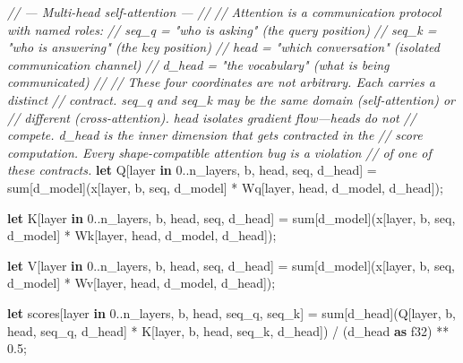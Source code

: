 \documentclass[11pt,]{article}
\newenvironment{Shaded}{}{}
\newcommand{\CommentTok}[1]{\textcolor[rgb]{0.38,0.63,0.69}{\textit{#1}}}
\newcommand{\DataTypeTok}[1]{\textcolor[rgb]{0.56,0.13,0.00}{#1}}
\newcommand{\DecValTok}[1]{\textcolor[rgb]{0.25,0.63,0.44}{#1}}
\newcommand{\KeywordTok}[1]{\textcolor[rgb]{0.00,0.44,0.13}{\textbf{#1}}}
\newcommand{\NormalTok}[1]{#1}
\newcommand{\OperatorTok}[1]{\textcolor[rgb]{0.40,0.40,0.40}{#1}}
\begin{document}
\begin{Shaded}
\begin{Highlighting}[]
\CommentTok{// --- Multi-head self-attention ---}
\CommentTok{//}
\CommentTok{// Attention is a communication protocol with named roles:}
\CommentTok{//   seq_q = "who is asking" (the query position)}
\CommentTok{//   seq_k = "who is answering" (the key position)}
\CommentTok{//   head  = "which conversation" (isolated communication channel)}
\CommentTok{//   d_head = "the vocabulary" (what is being communicated)}
\CommentTok{//}
\CommentTok{// These four coordinates are not arbitrary. Each carries a distinct}
\CommentTok{// contract. seq_q and seq_k may be the same domain (self-attention) or}
\CommentTok{// different (cross-attention). head isolates gradient flow—heads do not}
\CommentTok{// compete. d_head is the inner dimension that gets contracted in the}
\CommentTok{// score computation. Every shape-compatible attention bug is a violation}
\CommentTok{// of one of these contracts.}
\KeywordTok{let}\NormalTok{ Q}\OperatorTok{[}\NormalTok{layer }\KeywordTok{in} \DecValTok{0.}\NormalTok{.n_layers, b, head, seq, d_head}\OperatorTok{]}\NormalTok{ =}
\NormalTok{    sum}\OperatorTok{[}\NormalTok{d_model}\OperatorTok{]}\NormalTok{(x}\OperatorTok{[}\NormalTok{layer, b, seq, d_model}\OperatorTok{]}\NormalTok{ *}
\NormalTok{                  Wq}\OperatorTok{[}\NormalTok{layer, head, d_model, d_head}\OperatorTok{]}\NormalTok{);}

\KeywordTok{let}\NormalTok{ K}\OperatorTok{[}\NormalTok{layer }\KeywordTok{in} \DecValTok{0.}\NormalTok{.n_layers, b, head, seq, d_head}\OperatorTok{]}\NormalTok{ =}
\NormalTok{    sum}\OperatorTok{[}\NormalTok{d_model}\OperatorTok{]}\NormalTok{(x}\OperatorTok{[}\NormalTok{layer, b, seq, d_model}\OperatorTok{]}\NormalTok{ *}
\NormalTok{                  Wk}\OperatorTok{[}\NormalTok{layer, head, d_model, d_head}\OperatorTok{]}\NormalTok{);}

\KeywordTok{let}\NormalTok{ V}\OperatorTok{[}\NormalTok{layer }\KeywordTok{in} \DecValTok{0.}\NormalTok{.n_layers, b, head, seq, d_head}\OperatorTok{]}\NormalTok{ =}
\NormalTok{    sum}\OperatorTok{[}\NormalTok{d_model}\OperatorTok{]}\NormalTok{(x}\OperatorTok{[}\NormalTok{layer, b, seq, d_model}\OperatorTok{]}\NormalTok{ *}
\NormalTok{                  Wv}\OperatorTok{[}\NormalTok{layer, head, d_model, d_head}\OperatorTok{]}\NormalTok{);}

\KeywordTok{let}\NormalTok{ scores}\OperatorTok{[}\NormalTok{layer }\KeywordTok{in} \DecValTok{0.}\NormalTok{.n_layers, b, head, seq_q, seq_k}\OperatorTok{]}\NormalTok{ =}
\NormalTok{    sum}\OperatorTok{[}\NormalTok{d_head}\OperatorTok{]}\NormalTok{(Q}\OperatorTok{[}\NormalTok{layer, b, head, seq_q, d_head}\OperatorTok{]}\NormalTok{ *}
\NormalTok{                 K}\OperatorTok{[}\NormalTok{layer, b, head, seq_k, d_head}\OperatorTok{]}\NormalTok{)}
\NormalTok{    / (d_head }\KeywordTok{as} \DataTypeTok{f32}\NormalTok{) ** }\DecValTok{0.5}\NormalTok{;}


\end{Highlighting}
\end{Shaded}
\end{document}
